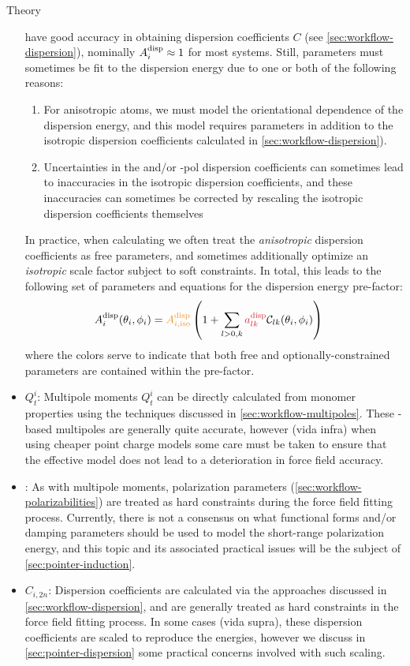 \begin{subsection}{Theory}
\begin{itemize}
have good accuracy in obtaining dispersion coefficients $C$ (see
\cref{sec:workflow-dispersion}),
nominally $A^{\text{disp}}_{i} \approx 1$ for most systems. Still, parameters must
sometimes be fit to the dispersion energy due to one or both of the following reasons: 
    \begin{enumerate}
    \item For anisotropic atoms, we must model the orientational dependence of
    the dispersion energy, and this model requires parameters in addition to
    the isotropic dispersion coefficients calculated in
    \cref{sec:workflow-dispersion}).
    \item Uncertainties in the \idma and/or \isa-pol dispersion coefficients can
    sometimes lead to inaccuracies in the isotropic dispersion coefficients,
    and these inaccuracies can sometimes be corrected by rescaling
    the isotropic dispersion coefficients themselves
    \end{enumerate}
In practice, when calculating  we often treat the \emph{anisotropic}
dispersion coefficients \adisp as free parameters, and sometimes additionally
optimize an \emph{isotropic} scale factor subject to
soft constraints.\footnotemark{ }
In total, this leads to the following set of parameters and equations for the
dispersion energy pre-factor:
%
\begin{align}
\Adisp{i}(\theta_i,\phi_i) &=
\textcolor{cfit}{\Adisp{i,\text{iso}}}
\left(1 + 
\sum\limits_{l>0,k} \textcolor{fit}{\adisp}  \mathcal{C}_{lk}(\theta_i,\phi_i)
\right)
\end{align}
where the colors serve to indicate that both free and optionally-constrained
parameters are contained within the pre-factor.
%
\item \textcolor{mon}{$Q^i_t$}:
Multipole moments $Q^i_t$ can be directly calculated from monomer properties
using the techniques discussed in \cref{sec:workflow-multipoles}. These
\isa-based multipoles are generally quite accurate, however (vida infra) when
using cheaper point charge models some care must be taken to ensure that the
effective model does not lead to a deterioration in force field accuracy.
\item \textcolor{mon}{\vdrude}:
As with multipole moments, polarization parameters
(\cref{sec:workflow-polarizabilities}) are treated as hard
constraints during the force field fitting process. Currently, there is not a
consensus on what functional forms and/or damping parameters should be used to 
model the short-range polarization energy, and this topic and its associated
practical issues will be the subject of \cref{sec:pointer-induction}.
\item \textcolor{mon}{$C_{i,2n}$}:
Dispersion coefficients are calculated via the approaches discussed in
\cref{sec:workflow-dispersion}, and are generally treated as hard constraints in the
force field fitting process. In some cases (vida supra), these dispersion
coefficients are scaled to reproduce the \sapt energies, however we discuss in
\cref{sec:pointer-dispersion} some practical concerns involved with such
scaling.
\end{itemize}



\end{subsection}
